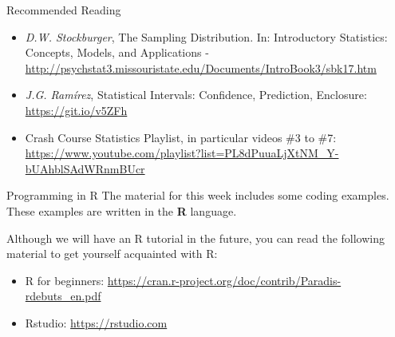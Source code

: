 \documentclass[aspectratio=169]{beamer}
\begin{document}
\begin{CJK}{UTF8}{ipxm}
\begin{frame}{Recommended Reading}
  \begin{itemize}
    \item \emph{D.W. Stockburger}, The Sampling Distribution. In: Introductory Statistics: Concepts, Models, and Applications -
    \url{http://psychstat3.missouristate.edu/Documents/IntroBook3/sbk17.htm}
    \item \emph{J.G. Ramírez}, Statistical Intervals: Confidence, Prediction, Enclosure: \url{https://git.io/v5ZFh}
    \item Crash Course Statistics Playlist, in particular videos \#3 to \#7: \url{https://www.youtube.com/playlist?list=PL8dPuuaLjXtNM_Y-bUAhblSAdWRnmBUcr}
  \end{itemize}
\end{frame}

\begin{frame}{Programming in R}
  The material for this week includes some coding examples. These examples are
  written in the {\bf R} language.\bigskip

  Although we will have an R tutorial in the future, you can read the
  following material to get yourself acquainted with R:\bigskip

  \begin{itemize}
    \item R for beginners: \url{https://cran.r-project.org/doc/contrib/Paradis-rdebuts_en.pdf}
    \item Rstudio: \url{https://rstudio.com}
  \end{itemize}
\end{frame}


\end{CJK}
\end{document}
